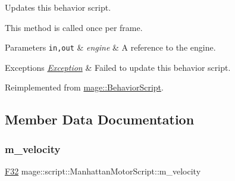 Updates this behavior script.

This method is called once per frame.


\begin{DoxyParams}[1]{Parameters}
\mbox{\tt in,out}  & {\em engine} & A reference to the engine. \\
\hline
\end{DoxyParams}

\begin{DoxyExceptions}{Exceptions}
{\em \mbox{\hyperlink{classmage_1_1_exception}{Exception}}} & Failed to update this behavior script. \\
\hline
\end{DoxyExceptions}


Reimplemented from \mbox{\hyperlink{classmage_1_1_behavior_script_a085634661326b59850c1111e537baa4e}{mage\+::\+Behavior\+Script}}.



\subsection{Member Data Documentation}
\mbox{\label{classmage_1_1script_1_1_manhattan_motor_script_a38cdef10269075f08f3fcdc9ed8bc520}} 
\subsubsection{\texorpdfstring{m\+\_\+velocity}{m\_velocity}}
{\footnotesize\ttfamily \mbox{\hyperlink{namespacemage_aa97e833b45f06d60a0a9c4fc22ae02c0}{F32}} mage\+::script\+::\+Manhattan\+Motor\+Script\+::m\+\_\+velocity\hspace{0.3cm}{\ttfamily [private]}}

